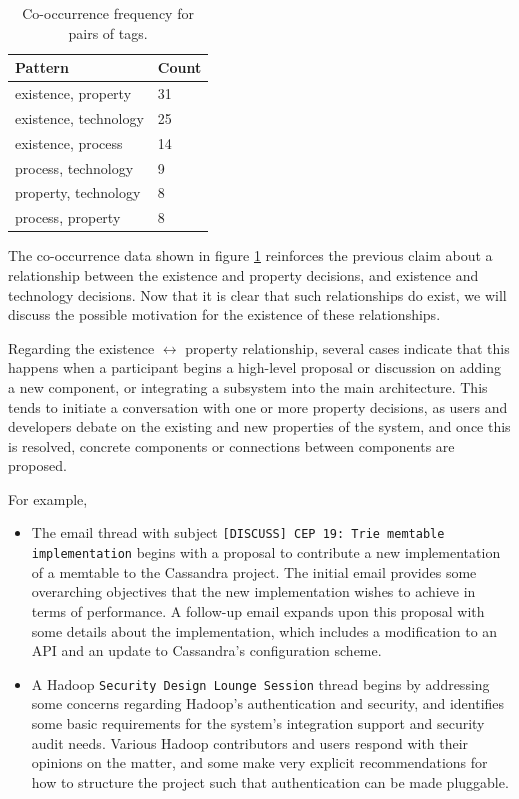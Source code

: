 \documentclass[a4paper, 12pt]{article}
\begin{document}
		\begin{table}[H]
			\centering
			\caption{Co-occurrence frequency for pairs of tags.}
			\begin{tabular}{|l|l|}
				\hline
				\textbf{Pattern} & \textbf{Count} \\ \hline
				existence, property & 31 \\ \hline
				existence, technology & 25 \\ \hline
				existence, process & 14 \\ \hline
				process, technology & 9 \\ \hline
				property, technology & 8 \\ \hline
				process, property & 8 \\ \hline
			\end{tabular}
			\label{fig:2co-occurrence}
		\end{table}
	
		The co-occurrence data shown in figure \ref{fig:2co-occurrence} reinforces the previous claim about a relationship between the existence and property decisions, and existence and technology decisions. Now that it is clear that such relationships do exist, we will discuss the possible motivation for the existence of these relationships.
		
		Regarding the existence $ \leftrightarrow $ property relationship, several cases indicate that this happens when a participant begins a high-level proposal or discussion on adding a new component, or integrating a subsystem into the main architecture. This tends to initiate a conversation with one or more property decisions, as users and developers debate on the existing and new properties of the system, and once this is resolved, concrete components or connections between components are proposed.
		
		For example,
		
		\begin{itemize}
			\item The email thread with subject \texttt{[DISCUSS] CEP 19: Trie memtable implementation} begins with a proposal to contribute a new implementation of a memtable to the Cassandra project. The initial email provides some overarching objectives that the new implementation wishes to achieve in terms of performance. A follow-up email expands upon this proposal with some details about the implementation, which includes a modification to an API and an update to Cassandra's configuration scheme.
			\item A Hadoop \texttt{Security Design Lounge Session} thread begins by addressing some concerns regarding Hadoop's authentication and security, and identifies some basic requirements for the system's integration support and security audit needs. Various Hadoop contributors and users respond with their opinions on the matter, and some make very explicit recommendations for how to structure the project such that authentication can be made pluggable.
		\end{itemize}
	
\end{document}
